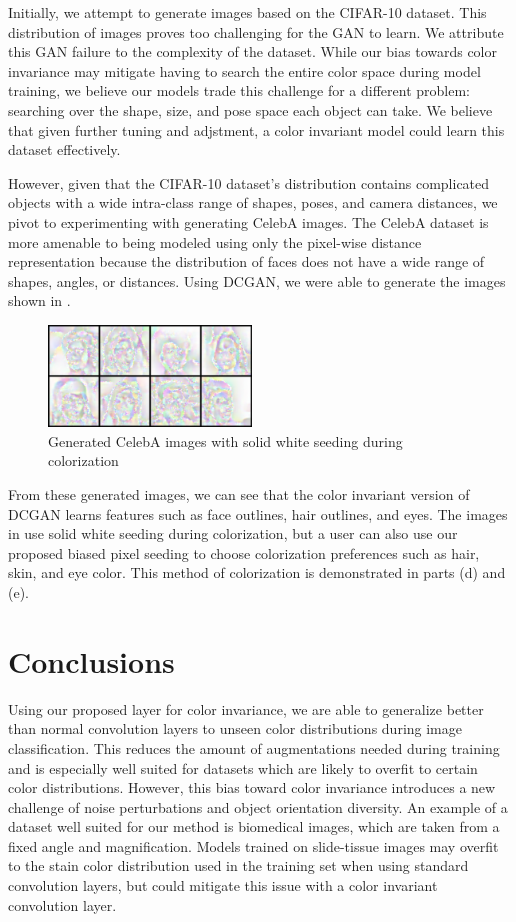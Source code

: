 \documentclass[10pt,twocolumn,letterpaper]{article}
\begin{document}
Initially, we attempt to generate images based on the CIFAR-10 dataset. This distribution of images proves too challenging for the GAN to learn. We attribute this GAN failure to the complexity of the dataset. While our bias towards color invariance may mitigate having to search the entire color space during model training, we believe our models trade this challenge for a different problem: searching over the shape, size, and pose space each object can take. We believe that given further tuning and adjstment, a color invariant model could learn this dataset effectively.

However, given that the CIFAR-10 dataset's distribution contains complicated objects with a wide intra-class range of shapes, poses, and camera distances, we pivot to experimenting with generating CelebA images. The CelebA dataset is more amenable to being modeled using only the pixel-wise distance representation because the distribution of faces does not have a wide range of shapes, angles, or distances. Using DCGAN, we were able to generate the images shown in .

\begin{figure}[h!]
    \centering
    \includegraphics[width=0.48\textwidth]{images/ganGrid.png}
    \caption{Generated CelebA images with solid white seeding during colorization}
    \label{celeba}
\end{figure}

From these generated images, we can see that the color invariant version of DCGAN learns features such as face outlines, hair outlines, and eyes. The images in  use solid white seeding during colorization, but a user can also use our proposed biased pixel seeding to choose colorization preferences such as hair, skin, and eye color. This method of colorization is demonstrated in  parts (d) and (e).

\section{Conclusions}

Using our proposed layer for color invariance, we are able to generalize better than normal convolution layers to unseen color distributions during image classification. This reduces the amount of augmentations needed during training and is especially well suited for datasets which are likely to overfit to certain color distributions. However, this bias toward color invariance introduces a new challenge of noise perturbations and object orientation diversity. An example of a dataset well suited for our method is biomedical images, which are taken from a fixed angle and magnification. Models trained on slide-tissue images may overfit to the stain color distribution used in the training set when using standard convolution layers, but could mitigate this issue with a color invariant convolution layer.
\end{document}
